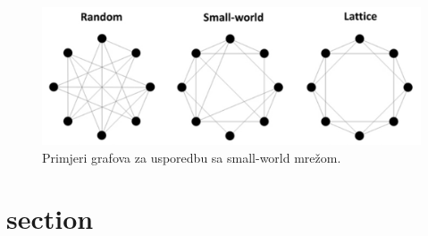 \begin{figure}
	\includegraphics[width=\linewidth]{images/small-world.png}
	\caption{Primjeri grafova za usporedbu sa small-world mrežom.}
	\label{fig:small-world}
\end{figure}


\section{section}